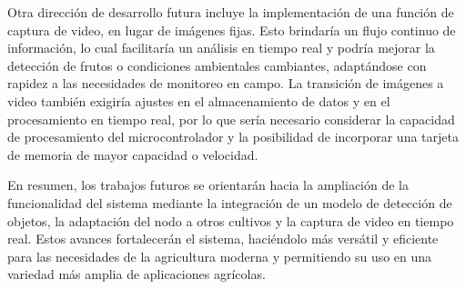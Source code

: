 Otra dirección de desarrollo futura incluye la implementación de una función de captura de video, en lugar de imágenes fijas. Esto brindaría un flujo continuo de información, lo cual facilitaría un análisis en tiempo real y podría mejorar la detección de frutos o condiciones ambientales cambiantes, adaptándose con rapidez a las necesidades de monitoreo en campo. La transición de imágenes a video también exigiría ajustes en el almacenamiento de datos y en el procesamiento en tiempo real, por lo que sería necesario considerar la capacidad de procesamiento del microcontrolador y la posibilidad de incorporar una tarjeta de memoria de mayor capacidad o velocidad.

En resumen, los trabajos futuros se orientarán hacia la ampliación de la funcionalidad del sistema mediante la integración de un modelo de detección de objetos, la adaptación del nodo a otros cultivos y la captura de video en tiempo real. Estos avances fortalecerán el sistema, haciéndolo más versátil y eficiente para las necesidades de la agricultura moderna y permitiendo su uso en una variedad más amplia de aplicaciones agrícolas.


\newpage